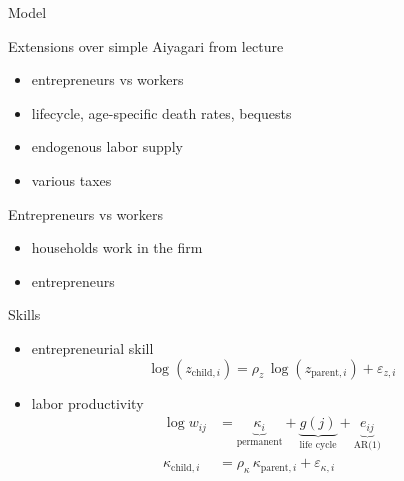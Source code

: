 \documentclass[aspectratio=169,mathserif]{beamer}
\begin{document}
\begin{frame}{Model}
    
\end{frame}

\begin{frame}{Extensions over simple Aiyagari from lecture}
    \begin{itemize}
        \item entrepreneurs vs workers
        \item lifecycle, age-specific death rates, bequests
        \item endogenous labor supply
        \item various taxes
    \end{itemize}
\end{frame}

\begin{frame}{Entrepreneurs vs workers}
    \begin{itemize}
        \item households work in the firm
        \item entrepreneurs 
    \end{itemize}
    
\end{frame}

\begin{frame}{Skills}
    \begin{itemize}
        \item entrepreneurial skill
        \begin{equation*}
            \log(z_{\text{child},i})
            = \rho_z\,\log(z_{\text{parent},i}) 
               + \varepsilon_{z,i}
        \end{equation*}
        \item labor productivity
        \begin{align*}        
            \log w_{i j}
                &= \underbrace{\kappa_i}_{\text{permanent}}
                   + \underbrace{g(j)}_{\text{life cycle}}
                   + \underbrace{e_{i j}}_{\text{AR(1)}}                \\
            \kappa_{\text{child},i}
                &= \rho_{\kappa}\,\kappa_{\text{parent},i} 
                   + \varepsilon_{\kappa,i}                                
        \end{align*}    
    \end{itemize}
\end{frame}
\end{document}
